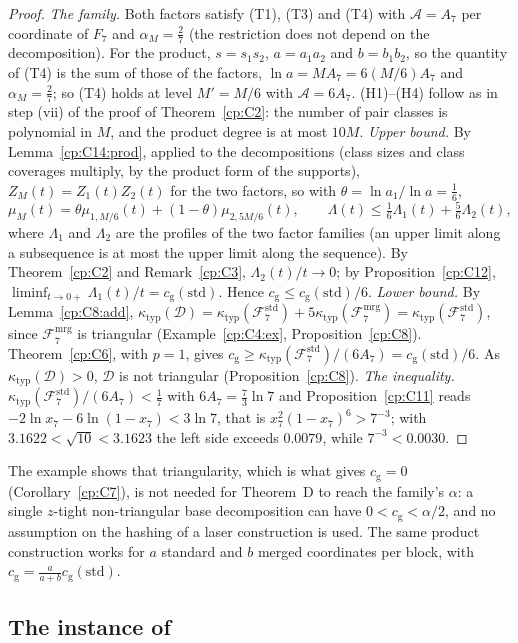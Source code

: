 \documentclass[11pt]{article}
\theoremstyle{definition}
\theoremstyle{remark}
\newcommand{\Lam}{\Lambda}                    %
\newcommand{\cg}{c_{\mathrm g}}               %
\newcommand{\Hcond}[1]{\textup{(H#1)}}        %
\newcommand{\Tcond}[1]{\textup{(T#1)}}        %
\newcommand{\ThmD}{Theorem~D}                               %
\newcommand{\Fstdq}[1]{\mathcal{F}^{\mathrm{std}}_{#1}} %
\newcommand{\Fmrgq}[1]{\mathcal{F}^{\mathrm{mrg}}_{#1}} %
\newcommand{\Acs}{\mathcal A}                %
\newcommand{\ktyp}{\kappa_{\mathrm{typ}}}    %
\begin{document}
\begin{proof}
\emph{The family.} Both factors satisfy \Tcond1, \Tcond3{} and \Tcond4{} with $\Acs=A_7$ per coordinate of $F_7$ and $\alpha_M=\frac27$ (the restriction does not depend on the decomposition). For the product, $s=s_1s_2$, $a=a_1a_2$ and $b=b_1b_2$, so the quantity of \Tcond4{} is the sum of those of the factors, $\ln a=MA_7=6(M/6)A_7$ and $\alpha_M=\frac27$; so \Tcond4{} holds at level $M'=M/6$ with $\Acs=6A_7$. \Hcond1--\Hcond4{} follow as in step (vii) of the proof of Theorem~\ref{cp:C2}: the number of pair classes is polynomial in $M$, and the product degree is at most $10M$.
\emph{Upper bound.} By Lemma~\ref{cp:C14:prod}, applied to the decompositions (class sizes and class coverages multiply, by the product form of the supports), $Z_M(t)=Z_{1}(t)Z_{2}(t)$ for the two factors, so with $\theta=\ln a_1/\ln a=\frac16$,
\[
\mu_M(t)=\theta\mu_{1,M/6}(t)+(1-\theta)\mu_{2,5M/6}(t),\qquad\Lam(t)\le\tfrac16\Lam_1(t)+\tfrac56\Lam_2(t),
\]
where $\Lam_1$ and $\Lam_2$ are the profiles of the two factor families (an upper limit along a subsequence is at most the upper limit along the sequence). By Theorem~\ref{cp:C2} and Remark~\ref{cp:C3}, $\Lam_2(t)/t\to0$; by Proposition~\ref{cp:C12}, $\liminf_{t\to0+}\Lam_1(t)/t=\cg(\text{std})$. Hence $\cg\le\cg(\text{std})/6$.
\emph{Lower bound.} By Lemma~\ref{cp:C8:add}, $\ktyp(\mathcal D)=\ktyp(\Fstdq{7})+5\ktyp(\Fmrgq{7})=\ktyp(\Fstdq{7})$, since $\Fmrgq{7}$ is triangular (Example~\ref{cp:C4:ex}, Proposition~\ref{cp:C8}). Theorem~\ref{cp:C6}, with $p=1$, gives $\cg\ge\ktyp(\Fstdq{7})/(6A_7)=\cg(\text{std})/6$. As $\ktyp(\mathcal D)>0$, $\mathcal D$ is not triangular (Proposition~\ref{cp:C8}).
\emph{The inequality.} $\ktyp(\Fstdq{7})/(6A_7)<\frac17$ with $6A_7=\frac73\ln7$ and Proposition~\ref{cp:C11} reads $-2\ln x_7-6\ln(1-x_7)<3\ln7$, that is $x_7^2(1-x_7)^6>7^{-3}$; with $3.1622<\sqrt{10}<3.1623$ the left side exceeds $0.0079$, while $7^{-3}<0.0030$.
\end{proof}

The example shows that triangularity, which is what gives $\cg=0$ (Corollary~\ref{cp:C7}), is not needed for \ThmD{} to reach the family's $\alpha$: a single $z$-tight non-triangular base decomposition can have $0<\cg<\alpha/2$, and no assumption on the hashing of a laser construction is used. The same product construction works for $a$ standard and $b$ merged coordinates per block, with $\cg=\frac a{a+b}\cg(\text{std})$.

\subsection{The instance of~\texorpdfstring{\cite{VXXZ24}}{VXXZ24}}\label{cp:sec:tr:vxxz}
\end{document}
